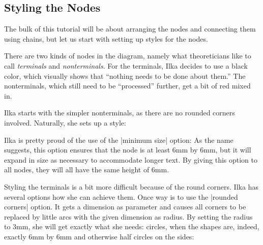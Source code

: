 \subsection{Styling the Nodes}

The bulk of this tutorial will be about arranging the nodes and
connecting them using chains, but let us start with setting up styles
for the nodes.

There are two kinds of nodes in the diagram, namely what theoreticians
like to call \emph{terminals} and \emph{nonterminals}. For the
terminals, Ilka decides to use a black color, which visually shows
that ``nothing needs to be done about them.'' The nonterminals, which
still need to be ``processed'' further, get a bit of red mixed in.

Ilka starts with the simpler nonterminals, as there are no rounded
corners involved. Naturally, she sets up a style:


\begin{codeexample}[]
\end{codeexample}
Ilka is pretty proud of the use of the |minimum size| option: As the
name suggests, this option ensures that the node is at least 6mm by
6mm, but it will expand in size as necessary to accommodate longer
text. By giving this option to all nodes, they will all have the same
height of 6mm.

Styling the terminals is a bit more difficult because of the round
corners. Ilka has several options how she can achieve them. Once way
is to use the |rounded corners| option. It gets a dimension as
parameter and causes all corners to be replaced by little arcs with
the given dimension as radius. By setting the radius to 3mm, she will
get exactly what she needs: circles, when the shapes are, indeed,
exactly 6mm by 6mm and otherwise half circles on the sides:

\begin{codeexample}[]
\end{codeexample}

